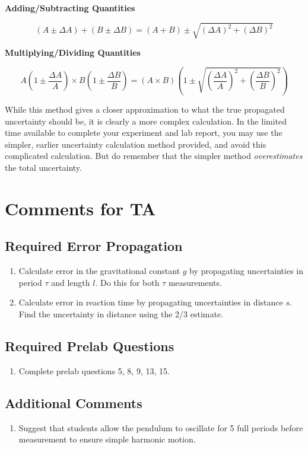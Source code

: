 \documentclass{article}
\begin{document}
\textbf{Adding/Subtracting Quantities}

\begin{equation}
    (A\pm\Delta A) + (B\pm\Delta B) = (A+B)\pm\sqrt{(\Delta A)^2+(\Delta B)^2}
\end{equation}

\myskip\textbf{Multiplying/Dividing Quantities}
\phantom{AAAA AAA AAAA AA AAA AAAA AAAA AAAAAAA AAA AAAA AAAA AAAA AAAAA AAAAA AAAAA AAAAAA AAAAAAA AAAAA AAA AAA AAAAA AAAAA AAAAA AAAAA AAAAA AAAAA AAAAA AAAAA AAAAA AAAAA AAAAA AAAAA AAAAA AAAAA AAAAAA}

\begin{equation}
    A\left(1\pm\frac{\Delta A}{A}\right) \times B\left(1\pm\frac{\Delta B}{B}\right) = \left(A \times B\right) \left ( 1 \pm\sqrt{\left(\frac{\Delta A}{A}\right)^2+\left(\frac{\Delta B}{B}\right)^2} \right )
\end{equation}

While this method gives a closer approximation to what the true propagated uncertainty should be, it is clearly a more complex calculation.  In the limited time available to complete your experiment and lab report, you may use the simpler, earlier uncertainty calculation method provided, and avoid this complicated calculation.  But do remember that the simpler method \emph{overestimates} the total uncertainty.


\section{Comments for TA}
\subsection{Required Error Propagation}
\begin{enumerate}
\item Calculate error in the gravitational constant $g$ by propagating uncertainties in period $\tau$ and length $l$. Do this for both $\tau$ measurements.
\item Calculate error in reaction time by propagating uncertainties in distance $s$. Find the uncertainty in distance using the 2/3 estimate.
\end{enumerate}

\subsection{Required Prelab Questions}
\begin{enumerate}
\item Complete prelab questions 5, 8, 9, 13, 15.
\end{enumerate}

\subsection{Additional Comments}
\begin{enumerate}
\item Suggest that students allow the pendulum to oscillate for 5 full periods before measurement to ensure simple harmonic motion.
\end{enumerate}
\end{document}
